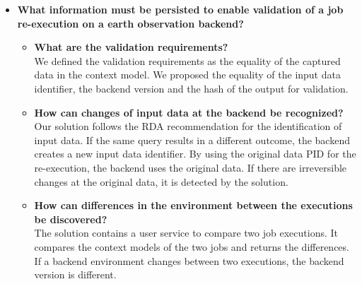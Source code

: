 \documentclass[draft,final]{vutinfth} %
\begin{document}
\begin{itemize}
\begin{itemize}
	\end{itemize}
	\item \textbf{What information must be persisted to enable validation of a job re-execution on a earth observation backend?}
	\begin{itemize}
		\item \textbf{What are the validation requirements?} \\
		We defined the validation requirements as the equality of the captured data in the context model. We proposed the equality of the input data identifier, the backend version and the hash of the output for validation.
		\item \textbf{How can changes of input data at the backend be recognized?} \\
		Our solution follows the RDA recommendation for the identification of input data. If the same query results in a different outcome, the backend creates a new input data identifier. 
		By using the original data PID for the re-execution, the backend uses the original data. If there are irreversible changes at the original data, it is detected by the solution.  
		\item \textbf{How can differences in the environment between the executions be discovered?} \\
		The solution contains a user service to compare two job executions. It compares the context models of the two jobs and returns the differences. If a backend environment changes between two executions, the backend version is different.
	\end{itemize}
\end{itemize}
\end{document}
